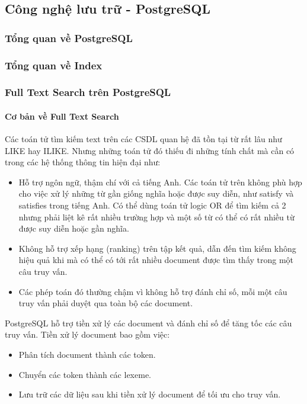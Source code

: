 \subsection{Công nghệ lưu trữ - PostgreSQL}

\subsubsection{Tổng quan về PostgreSQL}
\subsubsection{Tổng quan về Index}
\subsubsection{Full Text Search trên PostgreSQL}
\paragraph{Cơ bản về Full Text Search}
Các toán tử tìm kiếm text trên các CSDL quan hệ đã tồn
tại từ rất lâu như LIKE hay ILIKE. Nhưng những toán tử đó thiếu
đi những tính chất mà cần có trong các hệ thống thông tin hiện đại như:
\begin{itemize}[topsep=0ex]
\item Hỗ trợ ngôn ngữ, thậm chí với cả tiếng Anh. Các toán tử
    trên không phù hợp cho việc xử lý những từ gần giống nghĩa hoặc
    được suy diễn, như satisfy và satisfies trong tiếng Anh. Có thể
    dùng toán tử logic OR để tìm kiếm cả 2 nhưng phải liệt kê rất
    nhiều trường hợp và một số từ có thể có rất nhiều từ
    được suy diễn hoặc gần nghĩa.

\item Không hỗ trợ xếp hạng (ranking) trên tập kết quả,
    dẫn đến tìm kiếm không hiệu quả khi mà có thể có tới rất
    nhiều document được tìm thấy trong một câu truy vấn.

\item Các phép toán đó thường chậm vì không hỗ trợ đánh chỉ
    số, mỗi một câu truy vấn phải duyệt qua toàn bộ các document.
\end{itemize}

PostgreSQL hỗ trợ tiền xử lý các document và đánh chỉ
số để tăng tốc các câu truy vấn. Tiền xử lý document bao gồm việc:
\begin{itemize}[topsep=0ex]
\item Phân tích document thành các token.
\item Chuyển các token thành các lexeme.
\item Lưu trữ các dữ liệu sau khi tiền xử lý
    document để tối ưu cho truy vấn.
\end{itemize}

